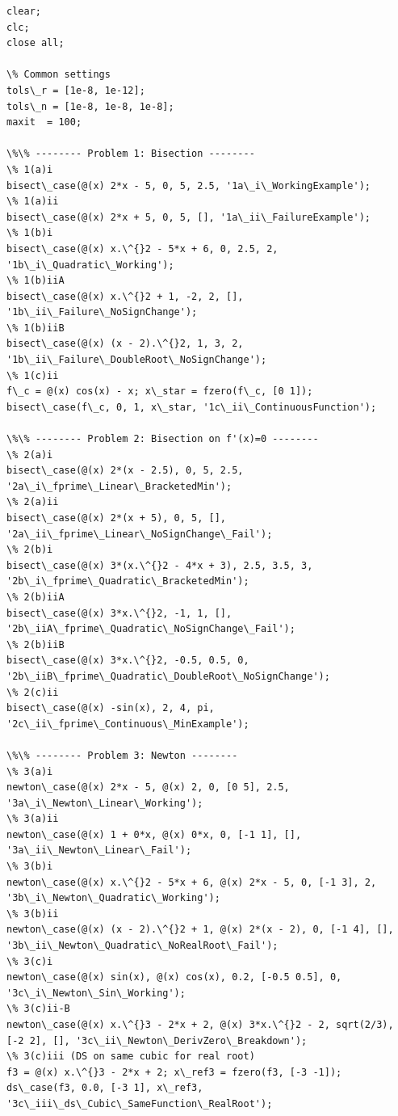\documentclass[11pt]{article}
\begin{document}
	\lstset{language=Matlab}
	\begin{lstlisting}[basicstyle=\ttfamily\small]%% Root-Finding Demos: 
%% Scott Nguyen ECE 506 HW 3
clear;
clc;
close all;

\% Common settings
tols\_r = [1e-8, 1e-12];
tols\_n = [1e-8, 1e-8, 1e-8];
maxit  = 100;

\%\% -------- Problem 1: Bisection --------
\% 1(a)i
bisect\_case(@(x) 2*x - 5, 0, 5, 2.5, '1a\_i\_WorkingExample');
\% 1(a)ii
bisect\_case(@(x) 2*x + 5, 0, 5, [], '1a\_ii\_FailureExample');
\% 1(b)i
bisect\_case(@(x) x.\^{}2 - 5*x + 6, 0, 2.5, 2, '1b\_i\_Quadratic\_Working');
\% 1(b)iiA
bisect\_case(@(x) x.\^{}2 + 1, -2, 2, [], '1b\_ii\_Failure\_NoSignChange');
\% 1(b)iiB
bisect\_case(@(x) (x - 2).\^{}2, 1, 3, 2, '1b\_ii\_Failure\_DoubleRoot\_NoSignChange');
\% 1(c)ii
f\_c = @(x) cos(x) - x; x\_star = fzero(f\_c, [0 1]);
bisect\_case(f\_c, 0, 1, x\_star, '1c\_ii\_ContinuousFunction');

\%\% -------- Problem 2: Bisection on f'(x)=0 --------
\% 2(a)i
bisect\_case(@(x) 2*(x - 2.5), 0, 5, 2.5, '2a\_i\_fprime\_Linear\_BracketedMin');
\% 2(a)ii
bisect\_case(@(x) 2*(x + 5), 0, 5, [], '2a\_ii\_fprime\_Linear\_NoSignChange\_Fail');
\% 2(b)i
bisect\_case(@(x) 3*(x.\^{}2 - 4*x + 3), 2.5, 3.5, 3, '2b\_i\_fprime\_Quadratic\_BracketedMin');
\% 2(b)iiA
bisect\_case(@(x) 3*x.\^{}2, -1, 1, [], '2b\_iiA\_fprime\_Quadratic\_NoSignChange\_Fail');
\% 2(b)iiB
bisect\_case(@(x) 3*x.\^{}2, -0.5, 0.5, 0, '2b\_iiB\_fprime\_Quadratic\_DoubleRoot\_NoSignChange');
\% 2(c)ii
bisect\_case(@(x) -sin(x), 2, 4, pi, '2c\_ii\_fprime\_Continuous\_MinExample');

\%\% -------- Problem 3: Newton --------
\% 3(a)i
newton\_case(@(x) 2*x - 5, @(x) 2, 0, [0 5], 2.5, '3a\_i\_Newton\_Linear\_Working');
\% 3(a)ii
newton\_case(@(x) 1 + 0*x, @(x) 0*x, 0, [-1 1], [], '3a\_ii\_Newton\_Linear\_Fail');
\% 3(b)i
newton\_case(@(x) x.\^{}2 - 5*x + 6, @(x) 2*x - 5, 0, [-1 3], 2, '3b\_i\_Newton\_Quadratic\_Working');
\% 3(b)ii
newton\_case(@(x) (x - 2).\^{}2 + 1, @(x) 2*(x - 2), 0, [-1 4], [], '3b\_ii\_Newton\_Quadratic\_NoRealRoot\_Fail');
\% 3(c)i
newton\_case(@(x) sin(x), @(x) cos(x), 0.2, [-0.5 0.5], 0, '3c\_i\_Newton\_Sin\_Working');
\% 3(c)ii-B
newton\_case(@(x) x.\^{}3 - 2*x + 2, @(x) 3*x.\^{}2 - 2, sqrt(2/3), [-2 2], [], '3c\_ii\_Newton\_DerivZero\_Breakdown');
\% 3(c)iii (DS on same cubic for real root)
f3 = @(x) x.\^{}3 - 2*x + 2; x\_ref3 = fzero(f3, [-3 -1]);
ds\_case(f3, 0.0, [-3 1], x\_ref3, '3c\_iii\_ds\_Cubic\_SameFunction\_RealRoot');


\end{lstlisting}
\end{document}
